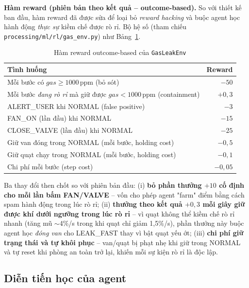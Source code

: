 \textbf{Hàm reward (phiên bản theo kết quả -- outcome-based).} So với thiết kế ban đầu, hàm reward đã được sửa để loại bỏ \emph{reward hacking} và buộc agent học hành động \emph{thực sự} kiềm chế được rò rỉ. Bộ hệ số (tham chiếu \texttt{processing/ml/rl/gas\_env.py}) như Bảng~\ref{tab:reward_shape_ch4}.

\begin{table}[H]
\centering
\caption{Hàm reward outcome-based của \texttt{GasLeakEnv}}
\label{tab:reward_shape_ch4}
\begin{tabular}{lr}
\toprule
\textbf{Tình huống} & \textbf{Reward} \\
\midrule
Mỗi bước có $gas \geq 1000$\,ppm (bỏ sót)                       & $-50$ \\
Mỗi bước \emph{đang rò rỉ} mà giữ được $gas < 1000$\,ppm (containment) & $+0{,}3$ \\
ALERT\_USER khi NORMAL (false positive)                        & $-3$ \\
FAN\_ON (lần đầu) khi NORMAL                                    & $-15$ \\
CLOSE\_VALVE (lần đầu) khi NORMAL                               & $-25$ \\
Giữ van đóng trong NORMAL (mỗi bước, holding cost)             & $-0{,}5$ \\
Giữ quạt chạy trong NORMAL (mỗi bước, holding cost)            & $-0{,}1$ \\
Chi phí mỗi bước (step cost)                                   & $-0{,}05$ \\
\bottomrule
\end{tabular}
\end{table}

Ba thay đổi then chốt so với phiên bản đầu: (i) \textbf{bỏ phần thưởng $+10$ cố định cho mỗi lần bấm FAN/VALVE} -- vốn cho phép agent "farm" điểm bằng cách spam hành động trong lúc rò rỉ; (ii) \textbf{thưởng theo kết quả $+0{,}3$ mỗi giây giữ được khí dưới ngưỡng trong lúc rò rỉ} -- vì quạt không thể kiềm chế rò rỉ nhanh (tăng mũ $\sim$4\%/s trong khi quạt chỉ giảm 1{,}5\%/s), phần thưởng này buộc agent học \emph{đóng van} cho LEAK\_FAST thay vì bật quạt yếu ớt; (iii) \textbf{chi phí giữ trạng thái và tự khôi phục} -- van/quạt bị phạt nhẹ khi giữ trong NORMAL và tự reset khi phòng an toàn trở lại, khiến mỗi sự kiện rò rỉ là độc lập.

\subsection{Diễn tiến học của agent}


